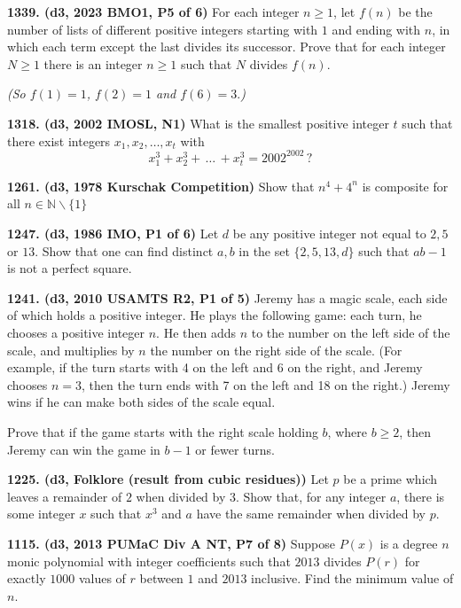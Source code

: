 \documentclass{article}
\begin{document}
\textbf{1339. (\color{red}d3\color{black}, 2023 BMO1, P5 of 6)} For each integer $n\ge1$, let $f(n)$ be the number of lists of different positive integers starting with $1$ and ending with $n$, in which each term except the last divides its successor. Prove that for each integer $N\ge1$ there is an integer $n\ge1$ such that $N$ divides $f(n)$.

\textit{(So $f(1)=1$, $f(2)=1$ and $f(6)=3.$)}

\textbf{1318. (\color{red}d3\color{black}, 2002 IMOSL, N1)} What is the smallest positive integer $t$ such that there exist integers $x_1,x_2,\ldots,x_t$ with\[x^3_1+x^3_2+\,\ldots\,+x^3_t=2002^{2002}\,?\]

\textbf{1261. (\color{red}d3\color{black}, 1978 Kurschak Competition)} Show that $n^4+4^n$ is composite for all $n \in \mathbb{N} \backslash \{1\}$

\textbf{1247. (\color{red}d3\color{black}, 1986 IMO, P1 of 6)} Let $d$ be any positive integer not equal to $2, 5$ or $13$. Show that one can find distinct $a,b$ in the set $\{2,5,13,d\}$ such that $ab-1$ is not a perfect square.

\textbf{1241. (\color{red}d3\color{black}, 2010 USAMTS R2, P1 of 5)} Jeremy has a magic scale, each side of which holds a positive integer. He plays the following game: each turn, he chooses a positive integer $n$. He then adds $n$ to the number on the left side of the scale, and multiplies by $n$ the number on the right side of the scale. (For example, if the turn starts with 4 on the left and 6 on the right, and Jeremy chooses $n = 3$, then the turn ends with 7 on the left and 18 on the right.) Jeremy wins if he can make both sides of the scale equal.

Prove that if the game starts with the right scale holding $b$, where $b \geq 2$, then Jeremy can win the game in $b - 1$ or fewer turns.


\textbf{1225. (\color{red}d3\color{black}, Folklore (result from cubic residues))} Let $p$ be a prime which leaves a remainder of \(2\) when divided by \(3\). Show that, for any integer \(a\), there is some integer \(x\) such that \(x^3\) and \(a\) have the same remainder when divided by \(p\).

\textbf{1115. (\color{red}d3\color{black}, 2013 PUMaC Div A NT, P7 of 8)} Suppose $P(x)$ is a degree $n$ monic polynomial with integer coefficients such that $2013$ divides $P(r)$ for exactly $1000$ values of $r$ between $1$ and $2013$ inclusive. Find the minimum value of $n$.
\end{document}
